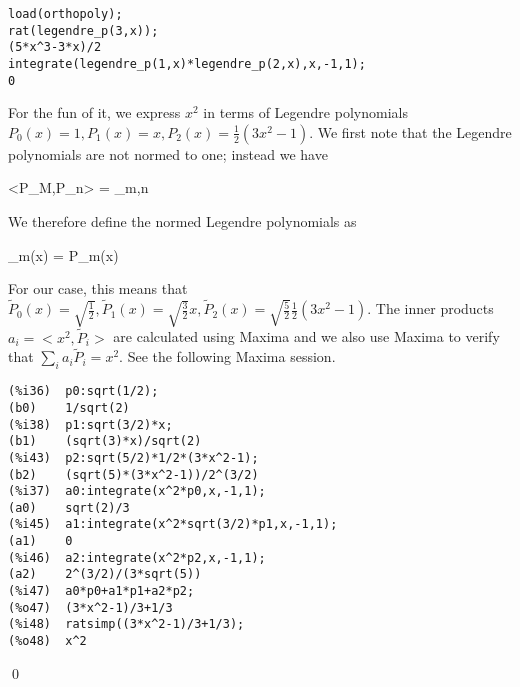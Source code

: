 \begin{verbatim}
load(orthopoly);
rat(legendre_p(3,x));
(5*x^3-3*x)/2
integrate(legendre_p(1,x)*legendre_p(2,x),x,-1,1);
0
\end{verbatim}

For the fun of it, we express $x^2$ in terms of Legendre polynomials $P_0(x) = 1, P_1(x) = x, P_2(x) = \frac{1}{2}(3x^2-1)$. We first note that the Legendre polynomials are not normed to one; instead we have

\bee
<P_M,P_n> =  \delta_{m,n}
\eee

We therefore define the normed Legendre polynomials as

\bee
{}_m(x) =  P_m(x)
\eee

For our case, this means that $\tilde{P}_0(x) = \sqrt{\frac{1}{2}}, \tilde{P}_1(x) = \sqrt{\frac{3}{2}}x, \tilde{P}_2(x) = \sqrt{\frac{5}{2}}\frac{1}{2}(3x^2-1)$. The inner products $a_i = <x^2, \tilde{P}_i>$ are calculated using Maxima and we also use Maxima to verify that $\sum_i a_i \tilde{P}_i = x^2$. See the following Maxima session.

\begin{verbatim}
(%i36)	p0:sqrt(1/2);
(b0)	1/sqrt(2)
(%i38)	p1:sqrt(3/2)*x;
(b1)	(sqrt(3)*x)/sqrt(2)
(%i43)	p2:sqrt(5/2)*1/2*(3*x^2-1);
(b2)	(sqrt(5)*(3*x^2-1))/2^(3/2)
(%i37)	a0:integrate(x^2*p0,x,-1,1);
(a0)	sqrt(2)/3
(%i45)	a1:integrate(x^2*sqrt(3/2)*p1,x,-1,1);
(a1)	0
(%i46)	a2:integrate(x^2*p2,x,-1,1);
(a2)	2^(3/2)/(3*sqrt(5))
(%i47)	a0*p0+a1*p1+a2*p2;
(%o47)	(3*x^2-1)/3+1/3
(%i48)	ratsimp((3*x^2-1)/3+1/3);
(%o48)	x^2
\end{verbatim}

\qed

